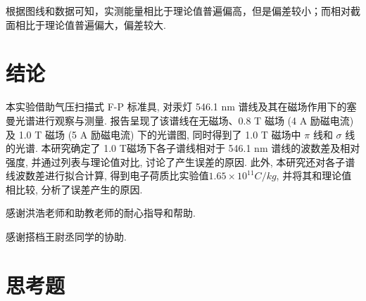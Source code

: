 \documentclass[font=default]{mpltx}
\begin{document}
      根据图线和数据可知，实测能量相比于理论值普遍偏高，但是偏差较小；而相对截面相比于理论值普遍偏大，偏差较大.


\section{结论}
  本实验借助气压扫描式 F-P 标准具, 
  对汞灯 546.1 nm 谱线及其在磁场作用下的塞曼光谱进行观察与测量.
  报告呈现了该谱线在无磁场、0.8 T 磁场 (4 A 励磁电流) 及 1.0 T 磁场 (5 A 励磁电流) 下的光谱图, 
  同时得到了 1.0 T 磁场中 $\pi$ 线和 $\sigma$ 线的光谱. 
  本研究确定了 1.0 T磁场下各子谱线相对于 546.1 nm 谱线的波数差及相对强度, 
  并通过列表与理论值对比, 讨论了产生误差的原因.
  此外, 本研究还对各子谱线波数差进行拟合计算, 得到电子荷质比实验值$1.65 \times 10^{11} C/kg$, 并将其和理论值相比较, 分析了误差产生的原因.

\begin{acknowledgments}
  感谢洪浩老师和助教老师的耐心指导和帮助.
  \par
  感谢搭档王尉丞同学的协助.
\end{acknowledgments}



\clearpage %
\appendix %
\section{思考题}\label{app:exercise}
\end{document}
